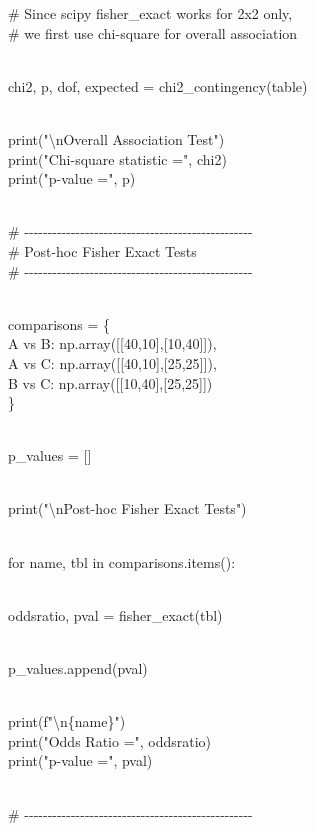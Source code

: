 \documentclass[
]{article}
\begin{document}
\# Since scipy fisher\_exact works for 2x2 only,\\
\# we first use chi-square for overall association\\
\strut \\
chi2, p, dof, expected = chi2\_contingency(table)\\
\strut \\
print("\textbackslash nOverall Association Test")\\
print("Chi-square statistic =", chi2)\\
print("p-value =", p)\\
\strut \\
\#
-\/-\/-\/-\/-\/-\/-\/-\/-\/-\/-\/-\/-\/-\/-\/-\/-\/-\/-\/-\/-\/-\/-\/-\/-\/-\/-\/-\/-\/-\/-\/-\/-\/-\/-\/-\/-\/-\/-\/-\/-\/-\/-\/-\/-\/-\/-\/-\/-\\
\# Post-hoc Fisher Exact Tests\\
\#
-\/-\/-\/-\/-\/-\/-\/-\/-\/-\/-\/-\/-\/-\/-\/-\/-\/-\/-\/-\/-\/-\/-\/-\/-\/-\/-\/-\/-\/-\/-\/-\/-\/-\/-\/-\/-\/-\/-\/-\/-\/-\/-\/-\/-\/-\/-\/-\/-\\
\strut \\
comparisons = \{\\
\textquotesingle A vs B\textquotesingle:
np.array({[}{[}40,10{]},{[}10,40{]}{]}),\\
\textquotesingle A vs C\textquotesingle:
np.array({[}{[}40,10{]},{[}25,25{]}{]}),\\
\textquotesingle B vs C\textquotesingle:
np.array({[}{[}10,40{]},{[}25,25{]}{]})\\
\}\\
\strut \\
p\_values = {[}{]}\\
\strut \\
print("\textbackslash nPost-hoc Fisher Exact Tests")\\
\strut \\
for name, tbl in comparisons.items():\\
\strut \\
oddsratio, pval = fisher\_exact(tbl)\\
\strut \\
p\_values.append(pval)\\
\strut \\
print(f"\textbackslash n\{name\}")\\
print("Odds Ratio =", oddsratio)\\
print("p-value =", pval)\\
\strut \\
\#
-\/-\/-\/-\/-\/-\/-\/-\/-\/-\/-\/-\/-\/-\/-\/-\/-\/-\/-\/-\/-\/-\/-\/-\/-\/-\/-\/-\/-\/-\/-\/-\/-\/-\/-\/-\/-\/-\/-\/-\/-\/-\/-\/-\/-\/-\/-\/-\/-\\
\end{document}
